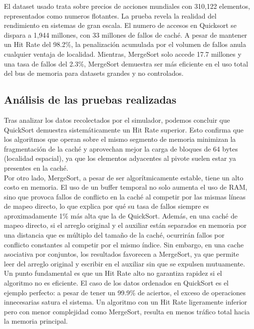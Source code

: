 \documentclass[12pt, a4paper]{article}
\begin{document}
	El dataset usado trata sobre precios de acciones mundiales con 310,122 elementos, representados como numeros flotantes. La prueba revela la realidad del rendimiento en sistemas de gran escala. El numero de accesos en Quicksort se dispara a 1,944 millones, con 33 millones de fallos de caché. A pesar de mantener un Hit Rate del 98.2\%, la penalización acumulada por el volumen de fallos anula cualquier ventaja de localidad. Mientras, MergeSort solo accede 17.7 millones y una tasa de fallos del 2.3\%, MergeSort demuestra ser más eficiente en el uso total del bus de memoria para datasets grandes y no controlados. \\


	\subsection{Análisis de las pruebas realizadas}
	
	Tras analizar los datos recolectados por el simulador, podemos concluir que QuickSort demuestra sistemáticamente un Hit Rate superior. Esto confirma que los algoritmos que operan sobre el mismo segmento de memoria minimizan la fragmentación de la caché y aprovechan mejor la carga de bloques de 64 bytes (localidad espacial), ya que los elementos adyacentes al pivote suelen estar ya presentes en la caché.\\
	
	Por otro lado, MergeSort, a pesar de ser algorítmicamente estable, tiene un alto costo en memoria. El uso de un buffer temporal no solo aumenta el uso de RAM, sino que provoca fallos de conflicto en la caché al competir por las mismas líneas de mapeo directo, lo que explica por qué su tasa de fallos siempre es aproximadamente 1\% más alta que la de QuickSort. Además, en una caché de mapeo directo, si el arreglo original y el auxiliar están separados en memoria por una distancia que es múltiplo del tamaño de la caché, ocurrirán fallos por conflicto constantes al competir por el mismo índice. Sin embargo, en una cache asociativa por conjuntos, los resultados favorecen a MergeSort, ya que permite leer del arreglo original y escribir en el auxiliar sin que se expulsen mutuamente.\\
	
	Un punto fundamental es que un Hit Rate alto no garantiza rapidez si el algoritmo no es eficiente. El caso de los datos ordenados en QuickSort es el ejemplo perfecto: a pesar de tener un 99.9\% de aciertos, el exceso de operaciones innecesarias satura el sistema. Un algoritmo con un Hit Rate ligeramente inferior pero con menor complejidad como MergeSort, resulta en menos tráfico total hacia la memoria principal.\\
	
\end{document}
